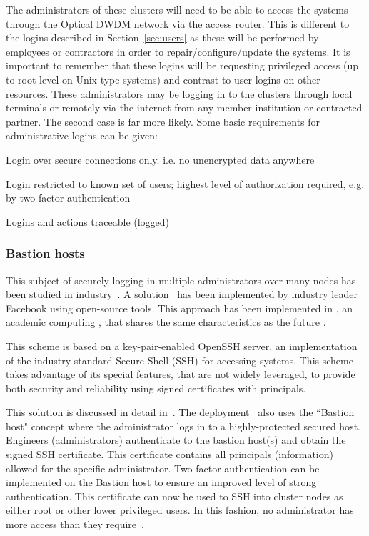 \documentclass[12pt,a4paper]{article}
\begin{document}
The administrators of these clusters will need to be able to access the \ED systems through the Optical DWDM network via the access router.
This is different to the logins described in Section~\ref{sec:users} as these will be performed by \EC employees or contractors
in order to repair/configure/update the systems.
It is important to remember that these logins will be requesting privileged access (up to root level on Unix-type systems) and contrast to user logins on other \einfra resources.
These administrators may be logging in to the clusters through local terminals or remotely via the internet from any \EC member institution
or contracted partner.
The second case is far more likely.
Some basic requirements for administrative logins can be given:
\bitm
\item Login over secure connections only. i.e. no unencrypted data anywhere

\item Login restricted to known set of users; highest level of authorization required, e.g. by two-factor authentication~\cite{two-factor}

\item Logins and actions traceable (logged)
\eitm

\subsubsection{Bastion hosts}
\label{ssec:bastion}

This subject of securely logging in multiple administrators over many nodes has been studied in industry~\cite{secure-ssh}.
A solution~\cite{fb-ssh} has been implemented by industry leader Facebook using open-source tools.
This approach has been implemented in \nnt, an academic computing \einfra, that shares the same characteristics as the future \ED \einfra.

This scheme is based on a key-pair-enabled OpenSSH server, an implementation of the industry-standard Secure Shell (SSH) for accessing systems.
This scheme takes advantage of its special features, that are not widely leveraged, to provide both security and reliability using signed certificates with principals.

This solution is discussed in detail in~\cite{fb-ssh}.
The \nnt deployment~\cite{nt1-ssh} also uses the ``Bastion host" concept where the administrator logs in to a highly-protected secured host.
Engineers (administrators) authenticate to the bastion host(s) and obtain the signed SSH certificate.
This certificate contains all principals (information) allowed for the specific administrator. 
Two-factor authentication can be implemented on the Bastion host to ensure an improved level of strong authentication.
This certificate can now be used to SSH into cluster nodes as either root or other lower privileged users.
In this fashion, no administrator has more access than they require~\cite{privileges}.
\end{document}
